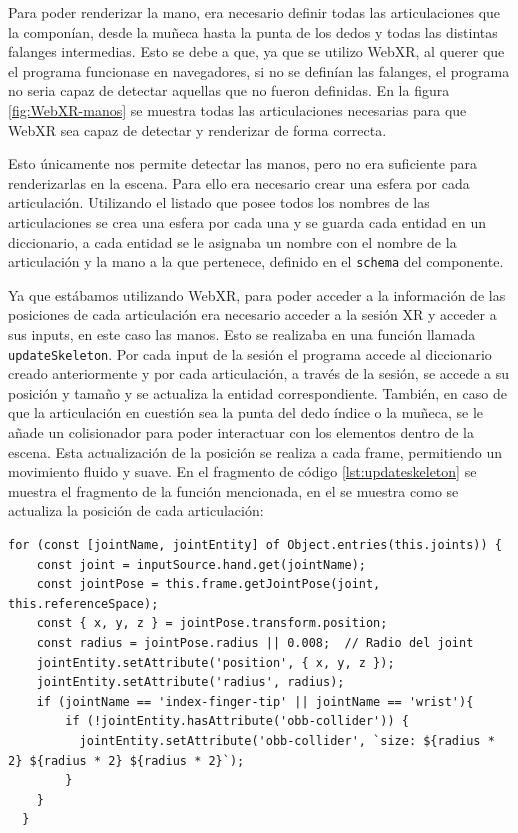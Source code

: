 \documentclass[a4paper, 12pt]{book}
\begin{document}
Para poder renderizar la mano, era necesario definir todas las articulaciones que la componían, desde la muñeca hasta la punta de los dedos y todas las distintas falanges intermedias. Esto se debe a que, ya que se utilizo WebXR, al querer que el programa funcionase en navegadores, si no se definían las falanges, el programa no seria capaz de detectar aquellas que no fueron definidas.
En la figura \ref{fig:WebXR-manos} se muestra todas las articulaciones necesarias para que WebXR sea capaz de detectar y renderizar de forma correcta. 

Esto únicamente nos permite detectar las manos, pero no era suficiente para renderizarlas en la escena. Para ello era necesario crear una esfera por cada articulación. Utilizando el listado que posee todos los nombres de las articulaciones se crea una esfera por cada una y se guarda cada entidad en un diccionario, a cada entidad se le asignaba un nombre con el nombre de la articulación y la mano a la que pertenece, definido en el \texttt{schema} del componente.

Ya que estábamos utilizando WebXR, para poder acceder a la información de las posiciones de cada articulación era necesario acceder a la sesión XR y acceder a sus inputs, en este caso las manos. Esto se realizaba en una función llamada \texttt{updateSkeleton}. Por cada input de la sesión el programa accede al diccionario creado anteriormente y por cada articulación, a través de la sesión, se accede a su posición y tamaño y se actualiza la entidad correspondiente. También, en caso de que la articulación en cuestión sea la punta del dedo índice o la muñeca, se le añade un colisionador para 
poder interactuar con los elementos dentro de la escena. Esta actualización de la posición se realiza a cada frame, permitiendo un movimiento fluido y suave. En el fragmento de código \ref{lst:updateskeleton} se muestra el fragmento de la función mencionada, en el se muestra como se actualiza la posición de cada articulación: 

\begin{lstlisting}[caption=Actualización de las manos en la escena, captionpos=b, label=lst:updateskeleton]
  for (const [jointName, jointEntity] of Object.entries(this.joints)) {
    const joint = inputSource.hand.get(jointName);
    const jointPose = this.frame.getJointPose(joint, this.referenceSpace);
    const { x, y, z } = jointPose.transform.position;
    const radius = jointPose.radius || 0.008;  // Radio del joint
    jointEntity.setAttribute('position', { x, y, z });
    jointEntity.setAttribute('radius', radius);
    if (jointName == 'index-finger-tip' || jointName == 'wrist'){
        if (!jointEntity.hasAttribute('obb-collider')) {
          jointEntity.setAttribute('obb-collider', `size: ${radius * 2} ${radius * 2} ${radius * 2}`);
        }
    }
  }
\end{lstlisting}
\end{document}
